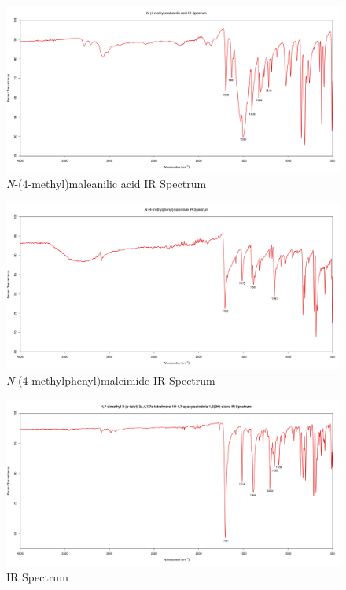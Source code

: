 \documentclass[11pt]{article}
\begin{document}
\begin{figure}[H]
    \centering
    \includegraphics[scale=0.33]{spectra/ir10.1.png}
    \caption{\textit{N}-(4-methyl)maleanilic acid IR Spectrum}
\end{figure}
\begin{figure}[H]
    \centering
    \includegraphics[scale=0.33]{spectra/ir10.2.png}
    \caption{\textit{N}-(4-methylphenyl)maleimide IR Spectrum}
\end{figure}
\begin{figure}[H]
    \centering
    \includegraphics[scale=0.33]{spectra/ir10.3.png}
    \caption{ IR Spectrum}
\end{figure}
\end{document}
